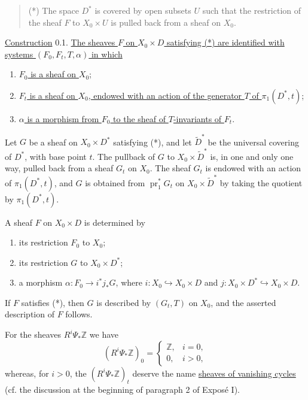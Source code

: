 \begin{quote}
(*) The space $D^*$ is covered by open subsets $U$ such that the
restriction of the sheaf $F$ to $X_0\times U$ is pulled back from a sheaf
on $X_0$.
\end{quote}

\underline{Construction} 0.1. \underline{The sheaves $F$ on
$X_0\times D$ satisfying (*) are identified with systems
$(F_0,F_t,T,\alpha)$ in which}
\begin{enumerate}[label=\alph*),leftmargin=2.5em]
\item \underline{$F_0$ is a sheaf on $X_0$};
\item \underline{$F_t$ is a sheaf on $X_0$, endowed with an action of
the generator $T$ of $\pi_1(D^*,t)$};
\item \underline{$\alpha$ is a morphism from $F_0$ to the sheaf of
$T$-invariants of $F_t$}.
\end{enumerate}

Let $G$ be a sheaf on $X_0\times D^*$ satisfying (*), and let
$\widetilde D^*$ be the universal covering of $D^*$, with base point
$t$.  The pullback of $G$ to $X_0\times\widetilde D^*$ is, in one and
only one way, pulled back from a sheaf $G_t$ on $X_0$.  The sheaf $G_t$
is endowed with an action of $\pi_1(D^*,t)$, and $G$ is obtained from
$\operatorname{pr}_1^*G_t$ on $X_0\times\widetilde D^*$ by taking the
quotient by $\pi_1(D^*,t)$.

A sheaf $F$ on $X_0\times D$ is determined by
\begin{enumerate}[label=\arabic*),leftmargin=2.5em]
\item its restriction $F_0$ to $X_0$;
\item its restriction $G$ to $X_0\times D^*$;
\item a morphism $\alpha:F_0\longrightarrow i^*j_*G$, where
$i:X_0\hookrightarrow X_0\times D$ and
$j:X_0\times D^*\hookrightarrow X_0\times D$.
\end{enumerate}
If $F$ satisfies (*), then $G$ is described by $(G_t,T)$ on $X_0$, and
the asserted description of $F$ follows.

For the sheaves $R^i\Psi_*\mathbb Z$ we have
\begin{equation*}
(R^i\Psi_*\mathbb Z)_0=
\begin{cases}
\mathbb Z, & i=0,\\
0, & i>0,
\end{cases}
\end{equation*}
whereas, for $i>0$, the $(R^i\Psi_*\mathbb Z)_t$ deserve the name
\underline{sheaves of vanishing cycles} (cf. the discussion at the
beginning of paragraph 2 of Expos\'e I).

